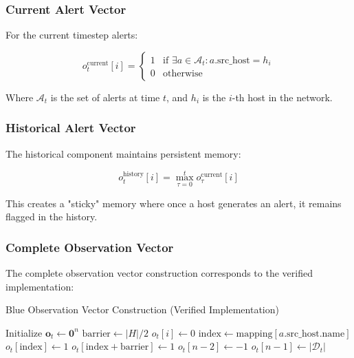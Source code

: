 \documentclass[12pt,a4paper]{article}
\begin{document}
\subsubsection{Current Alert Vector}
For the current timestep alerts:

\begin{equation}
o_t^{\text{current}}[i] = \begin{cases}
1 & \text{if } \exists a \in \mathcal{A}_t : a.\text{src\_host} = h_i \\
0 & \text{otherwise}
\end{cases}
\end{equation}

Where $\mathcal{A}_t$ is the set of alerts at time $t$, and $h_i$ is the $i$-th host in the network.

\subsubsection{Historical Alert Vector}
The historical component maintains persistent memory:

\begin{equation}
o_t^{\text{history}}[i] = \max_{\tau=0}^{t} o_\tau^{\text{current}}[i]
\end{equation}

This creates a "sticky" memory where once a host generates an alert, it remains flagged in the history.

\subsubsection{Complete Observation Vector}
The complete observation vector construction corresponds to the verified implementation:

\begin{algorithm}
\caption{Blue Observation Vector Construction (Verified Implementation)}
\begin{algorithmic}[1]
\STATE Initialize $\mathbf{o}_t \leftarrow \mathbf{0}^{n}$
\STATE $\text{barrier} \leftarrow |H|/2$
    \STATE $o_t[i] \leftarrow 0$ 
\ENDFOR
{}
        \STATE $\text{index} \leftarrow \text{mapping}[a.\text{src\_host.name}]$
        \STATE $o_t[\text{index}] \leftarrow 1$ 
        \STATE $o_t[\text{index} + \text{barrier}] \leftarrow 1$ 
    \ENDIF
\ENDFOR
\STATE $o_t[n-2] \leftarrow -1$ 
\STATE $o_t[n-1] \leftarrow |\mathcal{D}_t|$ 
\end{algorithmic}
\end{algorithm}
\end{document}

